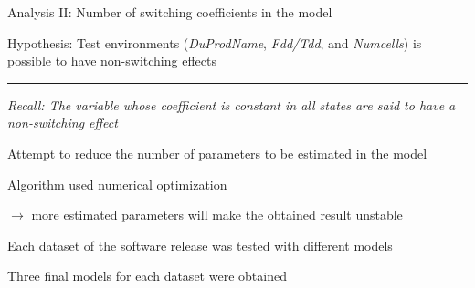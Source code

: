 \documentclass{beamer}
\begin{document}
\begin{frame}[fragile]
Analysis II: Number of switching coefficients in the model

Hypothesis: Test environments (\textit{DuProdName}, \textit{Fdd/Tdd}, and \textit{Numcells}) is possible to have non-switching effects
\rule{\textwidth}{0.4pt}

\begin{itemize}
	\item \small{\textit{Recall: The variable whose coefficient is \textit{constant} in all states are said to have a non-switching effect}}
	
	\item \normalsize{Attempt to reduce the number of parameters to be estimated in the model
	\item Algorithm used numerical optimization
	
	$\rightarrow$ more estimated parameters will make the obtained result unstable 
	
	\item Each dataset of the software release was tested with different models
	\item Three final models for each dataset were obtained}
\end{itemize}

\end{frame}
\end{document}
